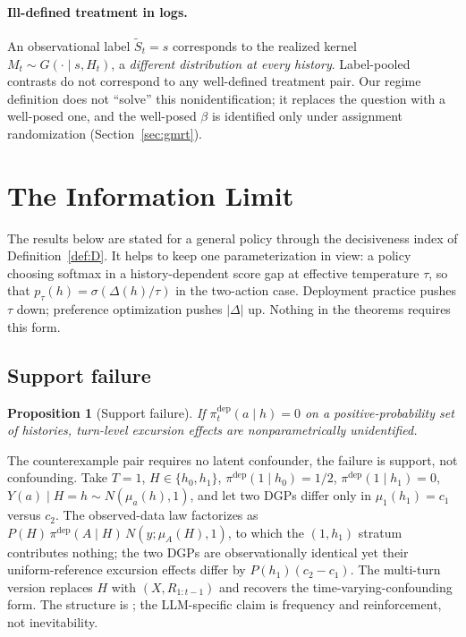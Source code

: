 \documentclass[11pt]{article}
\newtheorem{proposition}{Proposition}
\theoremstyle{definition}
\theoremstyle{remark}
\begin{document}
\paragraph{Ill-defined treatment in logs.} An observational label
$\tilde{S}_t = s$ corresponds to the realized kernel $M_t \sim G(\cdot \mid
s, H_t)$, a \emph{different distribution at every history}. Label-pooled
contrasts do not correspond to any well-defined treatment pair. Our regime
definition does not ``solve'' this nonidentification; it replaces the
question with a well-posed one, and the well-posed $\beta$ is identified
only under assignment randomization (Section~\ref{sec:gmrt}).

\section{The Information Limit}\label{sec:whynot}

The results below are stated for a general policy through the decisiveness
index of Definition~\ref{def:D}. It helps to keep one parameterization in
view: a policy choosing softmax in a history-dependent score gap at
effective temperature $\tau$, so that $p_\tau(h) = \sigma(\Delta(h)/\tau)$
in the two-action case. Deployment practice pushes $\tau$ down; preference
optimization pushes $|\Delta|$ up. Nothing in the theorems requires this
form.

\subsection{Support failure}\label{sec:1a}

\begin{proposition}[Support failure]\label{prop:1a}
If $\pi^{\mathrm{dep}}_t(a \mid h) = 0$ on a positive-probability set of
histories, turn-level excursion effects are nonparametrically unidentified.
\end{proposition}

The counterexample pair requires no latent confounder, the failure is
support, not confounding. Take $T = 1$, $H \in \{h_0, h_1\}$,
$\pi^{\mathrm{dep}}(1 \mid h_0) = 1/2$, $\pi^{\mathrm{dep}}(1 \mid h_1) = 0$,
$Y(a) \mid H = h \sim N(\mu_a(h), 1)$, and let two DGPs differ only in
$\mu_1(h_1) = c_1$ versus $c_2$. The observed-data law factorizes as
$P(H)\,\pi^{\mathrm{dep}}(A \mid H)\,N(y; \mu_A(H), 1)$, to which the
$(1, h_1)$ stratum contributes nothing; the two DGPs are observationally
identical yet their uniform-reference excursion effects differ by
$P(h_1)(c_2 - c_1)$. The multi-turn version replaces $H$ with
$(X, R_{1:t-1})$ and recovers the time-varying-confounding form. The
structure is \citet{robins1986new}; the LLM-specific claim is frequency and
reinforcement, not inevitability.
\end{document}
